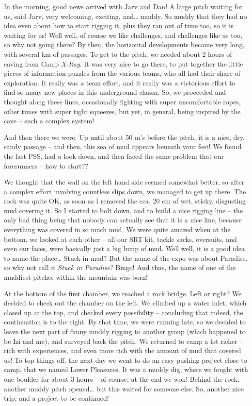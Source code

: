 In the morning, good news arrived with Jarv and Dan! A large pitch
waiting for us, said Jarv, very welcoming, exciting, and\ldots{} muddy.
So muddy that they had no idea even about how to start rigging it, plus
they ran out of time too, so it is waiting for us! Well well, of course
we like challenges, and challenges like us too, so why not going there?
By then, the horizontal developments became very long, with several km
of passages. To get to the pitch, we needed about 2 hours of caving from
Camp \emph{X-Ray}. It was very nice to go there, to put together the
little pieces of information puzzles from the various teams, who all had
their share of exploration. It really was a team effort, and it really
was a victorious effort to find so many new places in this underground
chasm. So, we proceeded and thought along these lines, occasionally
fighting with super uncomfortable ropes, other times with super tight
squeezes, but yet, in general, being inspired by the cave -- such a
complex system!

And then there we were. Up until about 50 m's before the pitch, it is a
nice, dry, sandy passage -- and then, this sea of mud appears beneath
your feet! We found the last PSS, had a look down, and then faced the
same problem that our forerunners -- how to start??

We thought that the wall on the left hand side seemed somewhat better,
so after a complex effort involving countless slips down, we managed to
get up there. The rock was quite OK, as soon as I removed the cca. 20 cm
of wet, sticky, disgusting mud covering it. So I started to bolt down,
and to build a nice rigging line -- the only bad thing being that nobody
can actually see that it is a nice line, because everything was covered
in so much mud. We were quite amazed when at the bottom, we looked at
each other -- all our SRT kit, tackle sacks, oversuits, and even our
faces, were basically just a big lump of mud. Well well, it is a good
idea to name the place\ldots{} Stuck in mud? But the name of the expo
was about Paradise, so why not call it \emph{Stuck in Paradise}? Bingo!
And thus, the name of one of the muddiest pitches within the mountain
was born!

At the bottom of the first chamber, we reached a rock bridge. Left or
right? We decided to check out the chamber on the left. We climbed up a
water inlet, which closed up at the top, and checked every possibility
-- concluding that indeed, the continuation is to the right. By that
time, we were running late, so we decided to leave the next part of
funny muddy rigging to another group (which happened to be Izi and me),
and surveyed back the pitch. We returned to camp a lot richer -- rich
with experiences, and even more rich with the amount of mud that covered
us! To top things off, the next day we went to do an easy pushing
project close to camp, that we named Lower Pleasures. It was a muddy
dig, where we fought with one boulder for about 3 hours -- of course, at
the end we won! Behind the rock, another muddy pitch opened\ldots{} but
this waited for someone else. So, another nice trip, and a project to be
continued!

